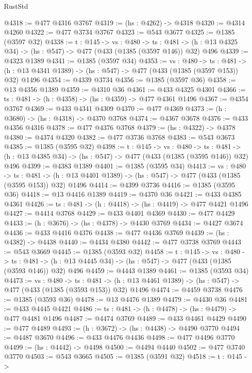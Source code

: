\begin{lexlean}{RustStd}
\begin{coremodule}
@4318 := @477 @4316 @3767
@4319 := (hs : @4262) -> @4318
@4320 := @4314 @4260
@4322 := @477 @3734 @3767
@4323 := @543 @3677
@4325 := @1385 (@3597 @32)
@4338 := {t : @145} ->
  {vs : @480} ->
  {ts : @481} -> (h : @13 @4325 @34) -> (hs : @547) -> @477 (@433 (@1385 (@3597 @146)) @32) @496
@4339 := @4323 @1389
@4341 := @1385 (@3597 @34)
@4353 := {vs : @480} ->
  {ts : @481} -> (h : @13 @4341 @1389) -> (hs : @547) -> @477 (@433 (@1385 (@3597 @153)) @32) @1496
@4354 := @4339 @3734
@4356 := @1385 (@3597 @36)
@4358 := @13 @4356 @1389
@4359 := @4310 @36
@4361 := @433 @4325 @4301
@4366 := {ts : @481} -> (h : @4358) -> (hs : @4359) -> @477 @4361 @1496
@4367 := @4354 @3767
@4369 := @433 @4341 @4309
@4370 := @477 @4369
@4373 := (h : @3680) -> (hs : @4318) -> @4370 @3768
@4374 := @4367 @3678
@4376 := @433 @4356 @4316
@4378 := @477 @4376 @3768
@4379 := (hs : @4322) -> @4378
@4380 := @4374 @4320
@4382 := @477 @3736 @3768
@4383 := @543 @3673
@4385 := @1385 (@3595 @32)
@4398 := {t : @145} ->
  {vs : @480} ->
  {ts : @481} -> (h : @13 @4385 @34) -> (hs : @547) -> @477 (@433 (@1385 (@3595 @146)) @32) @496
@4399 := @4383 @1389
@4401 := @1385 (@3595 @34)
@4413 := {vs : @480} ->
  {ts : @481} -> (h : @13 @4401 @1389) -> (hs : @547) -> @477 (@433 (@1385 (@3595 @153)) @32) @1496
@4414 := @4399 @3736
@4416 := @1385 (@3595 @36)
@4418 := @13 @4416 @1389
@4419 := @4370 @36
@4421 := @433 @4385 @4361
@4426 := {ts : @481} -> (h : @4418) -> (hs : @4419) -> @477 @4421 @1496
@4427 := @4414 @3768
@4429 := @433 @4401 @4369
@4430 := @477 @4429
@4433 := (h : @3676) -> (hs : @4378) -> @4430 @3769
@4434 := @4427 @3674
@4436 := @433 @4416 @4376
@4438 := @477 @4436 @3769
@4439 := (hs : @4382) -> @4438
@4440 := @4434 @4380
@4442 := @477 @3738 @3769
@4443 := @543 @3669
@4445 := @1385 (@3593 @32)
@4458 := {t : @145} ->
  {vs : @480} ->
  {ts : @481} -> (h : @13 @4445 @34) -> (hs : @547) -> @477 (@433 (@1385 (@3593 @146)) @32) @496
@4459 := @4443 @1389
@4461 := @1385 (@3593 @34)
@4473 := {vs : @480} ->
  {ts : @481} -> (h : @13 @4461 @1389) -> (hs : @547) -> @477 (@433 (@1385 (@3593 @153)) @32) @1496
@4474 := @4459 @3738
@4476 := @1385 (@3593 @36)
@4478 := @13 @4476 @1389
@4479 := @4430 @36
@4481 := @433 @4445 @4421
@4486 := {ts : @481} -> (h : @4478) -> (hs : @4479) -> @477 @4481 @1496
@4487 := @4474 @3769
@4489 := @433 @4461 @4429
@4490 := @477 @4489
@4493 := (h : @3672) -> (hs : @4438) -> @4490 @3770
@4494 := @4487 @3670
@4496 := @433 @4476 @4436
@4498 := @477 @4496 @3770
@4499 := (hs : @4442) -> @4498
@4500 := @4494 @4440
@4502 := @477 @3740 @3770
@4503 := @543 @3665
@4505 := @1385 (@3591 @32)
@4518 := {t : @145} ->

\end{coremodule}
\end{lexlean}
